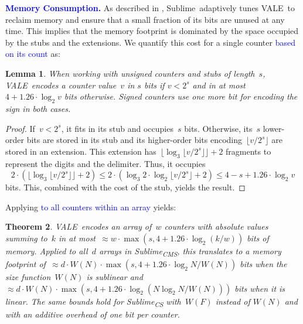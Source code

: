 \documentclass[sigconf]{acmart}
\newtheorem{theorem}{Theorem}[section]
\newtheorem{lemma}[theorem]{Lemma}
\newcommand{\sketch}{Sublime}
\newcommand{\sketchcms}{\sketch\textsubscript{CMS}\xspace}
\newcommand{\sketchcs}{\sketch\textsubscript{CS}\xspace}
\newcommand{\counterencodingabbrv}{VALE}
\begin{document}
\textcolor{blue}{\textbf{Memory Consumption.}}
As described in
, \sketch\
adaptively tunes \counterencodingabbrv\ to reclaim memory and ensure that a
small fraction of its bits are unused at any time. This implies that the memory
footprint is dominated by the space occupied by the stubs and the extensions.
We quantify this cost for a single counter \textcolor{blue}{based on its count}
as:
\begin{lemma}
    \label{lemma:single_counter_space}
    When working with unsigned counters and stubs of length~$s$,
    \counterencodingabbrv\ encodes a counter value~$v$ in $s$ bits if $v < 2^s$
    and in at most $4 + 1.26 \cdot \log_2 v$ bits otherwise. Signed counters
    use one more bit for encoding the sign in both cases.
\end{lemma}
\begin{proof}
    If~$v < 2^s$, it fits in its stub and occupies~$s$ bits. Otherwise, its~$s$
    lower-order bits are stored in its stub and its higher-order bits
    encoding~$\lfloor v/2^s \rfloor$ are stored in an extension. This extension
    has~$\lfloor \log_3 \lfloor v/2^s \rfloor \rfloor + 2$ fragments to
    represent the digits and the delimiter. Thus, it occupies
    $$ 2 \cdot (\lfloor \log_3 \lfloor v/2^s \rfloor \rfloor + 2) \leq 2 \cdot (\log_3 2 \cdot \log_2 \lfloor v/2^s \rfloor + 2) \leq 4 - s + 1.26 \cdot \log_2 v $$
    bits. This, combined with the cost of the stub, yields the result.
\end{proof}
Applying  \textcolor{blue}{to all
counters within an array} yields:
\begin{theorem}
    \label{thm:all_counters_space}
    \counterencodingabbrv\ encodes an array of~$w$ counters with absolute
    values summing to~$k$ in at most~$\approx w \cdot \max(s, 4 + 1.26 \cdot
    \log_2 (k/w))$ bits of memory. Applied to all~$d$ arrays in \sketchcms,
    this translates to a memory footprint of~$\approx d \cdot W(N) \cdot
    \max(s, 4 + 1.26 \cdot \log_2 N/W(N))$ bits when the size function~$W(N)$
    is sublinear and~$\approx d \cdot W(N) \cdot \max(s, 4 + 1.26 \cdot
    \log_2(N \log_2 N/W(N)))$ bits when it is linear. The same bounds hold for
    \sketchcs with~$W(F)$ instead of $W(N)$ and with an additive overhead of
    one bit per counter.
\end{theorem}
\end{document}
